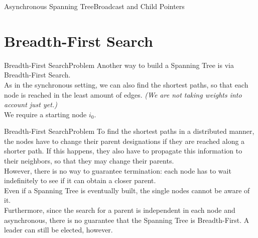 \documentclass[pdf]{beamer}
\begin{document}
\begin{frame}{Asynchronous Spanning Tree}{Broadcast and Child Pointers}
	
	
\end{frame}

\section{Breadth-First Search}
\begin{frame}{Breadth-First Search}{Problem}
	Another way to build a Spanning Tree is via Breadth-First Search. \\
    \vspace{12pt}
    \pause
    As in the synchronous setting, we can also find the shortest paths, so that each node is reached in the least amount of edges. \emph{(We are not taking weights into account just yet.)} \\
    \vspace{12pt}
    \pause
    We require a starting node $i_0$.
\end{frame}

\begin{frame}{Breadth-First Search}{Problem}
    To find the shortest paths in a distributed manner, the nodes have to change their parent designations if they are reached along a shorter path. If this happens, they also have to propagate this information to their neighbors, so that they may change their parents. \\
    \vspace{12pt}
    \pause
    However, there is no way to guarantee termination: each node has to wait indefinitely to see if it can obtain a closer parent. \\
    \vspace{12pt}
    \pause
    Even if a Spanning Tree is eventually built, the single nodes cannot be aware of it. \\
    \vspace{12pt}
    \pause
    Furthermore, since the search for a parent is independent in each node and asynchronous, there is no guarantee that the Spanning Tree is Breadth-First. A leader can still be elected, however.
\end{frame}
\end{document}

